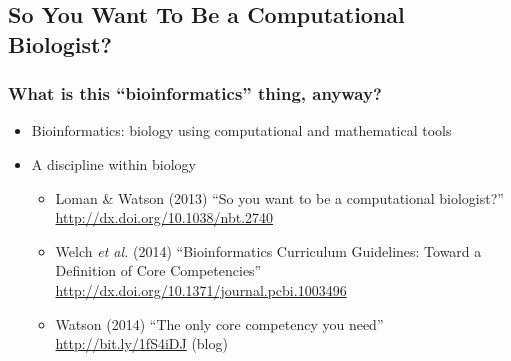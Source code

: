%

\subsection{So You Want To Be a Computational Biologist?}
\begin{frame}
  \frametitle{What is this ``bioinformatics'' thing, anyway?}
  \begin{itemize}
    \item Bioinformatics: biology using computational and mathematical tools
    \item A discipline within biology
    \begin{itemize}
      \item Loman \& Watson (2013) ``So you want to be a computational biologist?''
        \url{http://dx.doi.org/10.1038/nbt.2740}
      \item Welch \textit{et al.} (2014) ``Bioinformatics Curriculum Guidelines: Toward a Definition of Core Competencies''
      \url{http://dx.doi.org/10.1371/journal.pcbi.1003496}
      \item Watson (2014) ``The only core competency you need'' \url{http://bit.ly/1fS4iDJ} (blog)
    \end{itemize}
  \end{itemize}
\end{frame}

%

